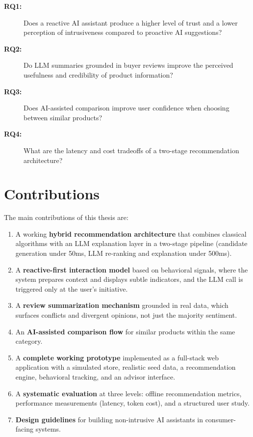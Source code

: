 \begin{description}
  \item[\textbf{RQ1:}] Does a reactive AI assistant produce a higher level of trust and a lower perception of intrusiveness compared to proactive AI suggestions?

  \item[\textbf{RQ2:}] Do LLM summaries grounded in buyer reviews improve the perceived usefulness and credibility of product information?

  \item[\textbf{RQ3:}] Does AI-assisted comparison improve user confidence when choosing between similar products?

  \item[\textbf{RQ4:}] What are the latency and cost tradeoffs of a two-stage recommendation architecture?
\end{description}


\section{Contributions}
\label{sec:intro-contributions}

\par The main contributions of this thesis are:

\begin{enumerate}
  \item A working \textbf{hybrid recommendation architecture} that combines classical algorithms with an LLM explanation layer in a two-stage pipeline (candidate generation under 50ms, LLM re-ranking and explanation under 500ms).

  \item A \textbf{reactive-first interaction model} based on behavioral signals, where the system prepares context and displays subtle indicators, and the LLM call is triggered only at the user's initiative.

  \item A \textbf{review summarization mechanism} grounded in real data, which surfaces conflicts and divergent opinions, not just the majority sentiment.

  \item An \textbf{AI-assisted comparison flow} for similar products within the same category.

  \item A \textbf{complete working prototype} implemented as a full-stack web application with a simulated store, realistic seed data, a recommendation engine, behavioral tracking, and an advisor interface.

  \item A \textbf{systematic evaluation} at three levels: offline recommendation metrics, performance measurements (latency, token cost), and a structured user study.

  \item \textbf{Design guidelines} for building non-intrusive AI assistants in consumer-facing systems.
\end{enumerate}


